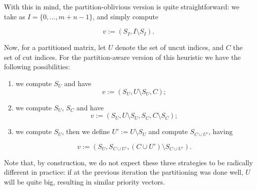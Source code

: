 With this in mind, the partition-oblivious version is quite straightforward: we take as $I = \{ 0,\dots,m+n-1\}$, and simply compute

\[
	v := (S_I,I \setminus S_I).
\]

Now, for a partitioned matrix, let $U$ denote the set of uncut indices, and $C$ the set of cut indices. For the partition-aware version of this heuristic we have the following possibilities:

\begin{enumerate}
	\item we compute $S_U$ and have 
\[
	v := (S_U,U \setminus S_U, C);
\]

	\item we compute $S_U$, $S_C$ and have
\[
		v := (S_U, U \setminus S_U, S_C, C \setminus S_C);
\]

	\item we compute $S_U$, then we define $U' := U \setminus S_U$ and compute $S_{C \cup U'}$, having

		\[
			v:= (S_U, S_{C \cup U'}, (C \cup U') \setminus S_{C \cup U'}).
		\]
\end{enumerate}

Note that, by construction, we do not expect these three strategies to be radically different in practice: if at the previous iteration the partitioning was done well, $U$ will be quite big, resulting in similar priority vectors.
